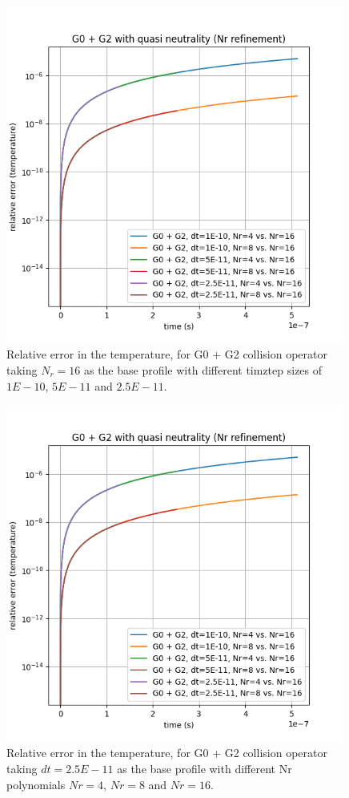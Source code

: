 \documentclass{article}
\begin{document}
\begin{figure}[H]
    \centering
    \includegraphics[width=0.99\textwidth]{dat/g02_nr_1ev.png}
    \caption{Relative error in the temperature, for G0 + G2 collision operator taking $N_r=16$ as the base profile with different timztep sizes of $1E-10$, $5E-11$ and $2.5E-11$.}
\end{figure}

\begin{figure}[H]
    \centering
    \includegraphics[width=0.99\textwidth]{dat/g02_nr_1ev.png}
    \caption{Relative error in the temperature, for G0 + G2 collision operator taking $dt=2.5E-11$ as the base profile with different Nr polynomials $Nr=4$, $Nr=8$ and $Nr=16$.}
\end{figure}
\end{document}
